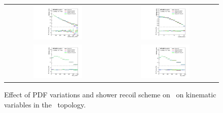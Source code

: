 \begin{figure}[p]
\begin{center}
\begin{tabular}{cc}
\includegraphics[width=0.48\textwidth]{Modeling/Figures/other_tt2bq_q1_pt_norm} &
\includegraphics[width=0.48\textwidth]{Modeling/Figures/other_tt2bq_q1_eta_norm} \\
\includegraphics[width=0.48\textwidth]{Modeling/Figures/other_tt2bq_top_pt_norm} &
\includegraphics[width=0.48\textwidth]{Modeling/Figures/other_tt2bq_ttbar_pt_norm} \\
\end{tabular}
\caption{Effect of PDF variations and shower recoil scheme  on \ShOL\ on kinematic variables in the \ttbb\ topology.}
\label{fig:other_tt2b}
\end{center}
\end{figure}
